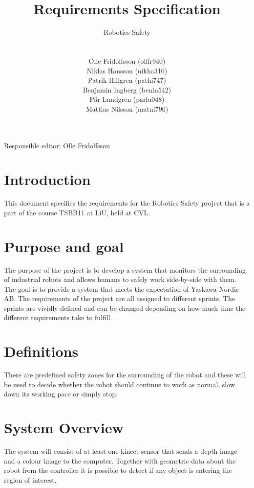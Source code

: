 \documentclass[10pt,a4paper]{article}
\title{Requirements Specification}
\author{\begin{large}{Robotics Safety}\end{large}\\\\
Olle Fridolfsson (ollfr940) \\  Niklas Hansson (nikha310) \\ Patrik Hillgren (pathi747) \\ Benjamin Ingberg (benin542)\\ Pär Lundgren (parlu048) \\ Mattias Nilsson (matni796)}
\begin{document}
\maketitle
\centerline {Responsible editor: Olle Fridolfsson}
\newpage
\tableofcontents
\newpage
\noindent %
\section{Introduction}
This document specifies the requirements for the Robotics Safety project that is a part of the course TSBB11 at LiU, held at CVL.
\section{Purpose and goal}
The purpose of the project is to develop a system that monitors the surrounding of industrial robots and allows humans to safely work side-by-side with them. 
The goal is to provide a system that meets the expectation of Yaskawa Nordic AB.
The requirements of the project are all assigned to different sprints. The sprints are vividly defined and can be changed depending on how much time the different requirements take to fulfill. 

\section{Definitions}
There are predefined safety zones for the surrounding of the robot and these will be used to decide whether the robot should continue to work as normal, slow down its working pace or simply stop.

\section{System Overview}
The system will consist of at least one kinect sensor that sends a depth image and a colour image to the computer. Together with geometric data about the robot from the controller it is possible to detect if any object is entering the region of interest.
\end{document}
